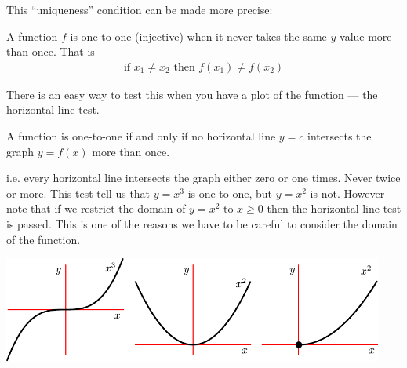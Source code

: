 This ``uniqueness'' condition can be made more precise:
\begin{defn}
 A function $f$ is one-to-one (injective) when it never takes the same $y$
value more than once. That is
\begin{align*}
  \mbox{if } x_1 \neq x_2 \mbox{ then } f(x_1) \neq f(x_2)
\end{align*}
\end{defn}
There is an easy way to test this when you have a plot of the function --- the
horizontal line test.
\begin{defn}
 A function is one-to-one if and only if no horizontal line $y=c$ intersects
the graph $y=f(x)$ more than once.
\end{defn}
\noindent i.e. every horizontal line intersects the graph either zero or
one times. Never twice or more. This test tell us that $y=x^3$ is
one-to-one, but $y=x^2$ is not. However note that if we restrict the domain of
$y=x^2$ to $x \geq 0$ then the horizontal line test is passed. This is one of
the reasons we have to be careful to consider the domain of the function.
\begin{fig}
\begin{center}
 \includegraphics[height=3.5cm]{inv1A}
\end{center}
\end{fig}


